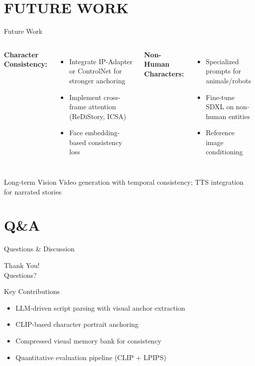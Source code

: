 \documentclass{beamer}
\begin{document}
\section{FUTURE WORK}
\begin{frame}{Future Work}
    \begin{columns}
        \footnotesize
        \textbf{Character Consistency:}
        \begin{itemize}
            \item Integrate IP-Adapter or ControlNet for stronger anchoring
            \item Implement cross-frame attention (ReDiStory, ICSA)
            \item Face embedding-based consistency loss
        \end{itemize}
        \footnotesize
        \textbf{Non-Human Characters:}
        \begin{itemize}
            \item Specialized prompts for animals/robots
            \item Fine-tune SDXL on non-human entities
            \item Reference image conditioning
        \end{itemize}
    \end{columns}
    \vspace{1em}
    \begin{block}{Long-term Vision}
        \footnotesize
        Video generation with temporal consistency; TTS integration for narrated stories
    \end{block}
\end{frame}

\section{Q\&A}
\begin{frame}{Questions \& Discussion}
    \begin{center}
        \LARGE Thank You! \\
        \vspace{1em}
        \large Questions?
    \end{center}
    \vspace{1em}
    \begin{block}{Key Contributions}
        \footnotesize
        \begin{itemize}
            \item LLM-driven script parsing with visual anchor extraction
            \item CLIP-based character portrait anchoring
            \item Compressed visual memory bank for consistency
            \item Quantitative evaluation pipeline (CLIP + LPIPS)
        \end{itemize}
    \end{block}
\end{frame}
\end{document}
